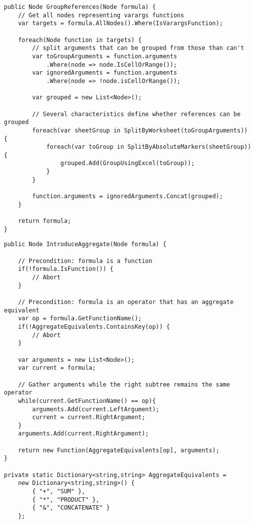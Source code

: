 \lstset{style=sharpc}
\begin{lstlisting}[float,caption={Group References Refactoring (simplified)}, label={lst:groupreferences}]
public Node GroupReferences(Node formula) {
	// Get all nodes representing varargs functions
	var targets = formula.AllNodes().Where(IsVarargsFunction);
	
	foreach(Node function in targets) {
		// split arguments that can be grouped from those than can't
		var toGroupArguments = function.arguments
			.Where(node => node.IsCellOrRange());
		var ignoredArguments = function.arguments
			.Where(node => !node.isCellOrRange());
		
		var grouped = new List<Node>();
		
		// Several characteristics define whether references can be grouped
		foreach(var sheetGroup in SplitByWorksheet(toGroupArguments)) {
			foreach(var toGroup in SplitByAbsoluteMarkers(sheetGroup)) {
				grouped.Add(GroupUsingExcel(toGroup));
			}
		}
		
		function.arguments = ignoredArguments.Concat(grouped);
	}
	
	return formula;
}

\end{lstlisting}

\lstset{style=sharpc}
\begin{lstlisting}[float,caption={Introduce Aggregate (simplified)}, label={lst:introduceaggregate}]
public Node IntroduceAggregate(Node formula) {

	// Precondition: formula is a function
	if(!formula.IsFunction()) {
		// Abort
	}
	
	// Precondition: formula is an operator that has an aggregate equivalent
	var op = formula.GetFunctionName();
	if(!AggregateEquivalents.ContainsKey(op)) {
		// Abort
	}
	
	var arguments = new List<Node>();
	var current = formula;
	
	// Gather arguments while the right subtree remains the same operator
	while(current.GetFunctionName() == op){
		arguments.Add(current.LeftArgument);
		current = current.RightArgument;
	}
	arguments.Add(current.RightArgument);
	
	return new Function(AggregateEquivalents[op], arguments);
}

private static Dictionary<string,string> AggregateEquivalents =
	new Dictionary<string,string>() {
		{ "+", "SUM" },
		{ "*", "PRODUCT" },
		{ "&", "CONCATENATE" }
	};

\end{lstlisting}

